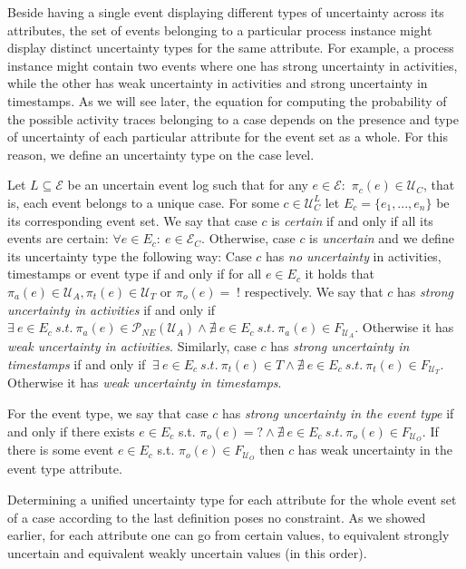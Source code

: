 Beside having a single event displaying different types of uncertainty across its attributes, the set of events belonging to a particular process instance might display distinct uncertainty types for the same attribute.
For example, a process instance might contain two events where one has strong uncertainty in activities, while the other has weak uncertainty in activities and strong uncertainty in timestamps.
As we will see later, the equation for computing the probability of the possible activity traces belonging to a case depends on the presence and type of uncertainty of each particular attribute for the event set as a whole.
For this reason, we define an uncertainty type on the case level.

\begin{definition}
Let $L \subseteq \mathcal{E}$ be an uncertain event log such that for any $e \in \mathcal{E}:$ $\pi_c(e) \in \mathcal{U}_C$, that is, each event belongs to a unique case.
For some $c \in \mathcal{U}_C^L$ let $E_c = \{e_1,...,e_n\}$ be its corresponding event set.
We say that case $c$ is \emph{certain} if and only if all its events are certain: $\forall e \in E_c: ~ e \in \mathcal{E}_C$. 
Otherwise, case $c$ is \emph{uncertain} and we define its uncertainty type the following way:
Case $c$ has \emph{no uncertainty} in activities, timestamps or event type if and only if for all $e \in E_c$ it holds that $\pi_a(e)\in \mathcal{U}_A, \pi_t(e) \in \mathcal{U}_T$ or $\pi_o(e)= \;!$ respectively.
We say that $c$ has \emph{strong uncertainty in activities} if and only if 
$\exists ~ e \in E_c ~ s.t. ~ \pi_a(e) \in \mathcal{P}_{NE}(\mathcal{U}_A) \wedge \nexists ~ e \in E_c ~ s.t. ~ \pi_a(e) \in F_{\mathcal{U}_A}$.
Otherwise it has \emph{weak uncertainty in activities}.
Similarly, case $c$ has \emph{strong uncertainty in timestamps} if and only if
$~ \exists ~ e \in E_c ~ s.t. ~ \pi_t(e) \in T \wedge \nexists ~ e \in E_c ~ s.t. ~ \pi_t(e) \in F_{\mathcal{U}_T}$.
Otherwise it has \emph{weak uncertainty in timestamps}.

For the event type, we say that case $c$ has \emph{strong uncertainty in the event type} if and only if there exists $e \in E_c$ s.t. $\pi_o(e)=? \wedge \nexists ~ e \in E_c ~ s.t. ~ \pi_o(e) \in F_{\mathcal{U}_O}$.
If there is some event $e \in E_c$ s.t. $\pi_o(e) \in F_{\mathcal{U}_O}$ then $c$ has weak uncertainty in the event type attribute.
\end{definition}

Determining a unified uncertainty type for each attribute for the whole event set of a case according to the last definition poses no constraint. 
As we showed earlier, for each attribute one can go from certain values, to equivalent strongly uncertain and equivalent weakly uncertain values (in this order).

